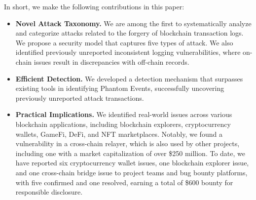In short, we make the following contributions in this paper:
\begin{itemize}
\item \textbf{Novel Attack Taxonomy.}
We are among the first to systematically analyze and categorize attacks
related to the forgery of blockchain transaction logs. We propose a security model that captures
five types of attack. We also identified previously unreported inconsistent logging
vulnerabilities, where on-chain issues result in discrepancies with off-chain records.
\item \textbf{Efficient Detection.}
We developed a detection mechanism that surpasses existing tools in identifying Phantom Events,
successfully uncovering previously unreported attack transactions.
\item \textbf{Practical Implications.}
We identified real-world issues across various blockchain applications, including blockchain
explorers, cryptocurrency wallets, GameFi, DeFi, and NFT marketplaces.
Notably, we found a vulnerability in a cross-chain relayer, which is also used by other projects,
including one with a market capitalization of over \$250 million.
To date, we have reported six cryptocurrency wallet issues, one blockchain explorer issue, and one
cross-chain bridge issue to project teams and bug bounty platforms, with five confirmed and one
resolved, earning a total of \$600 bounty for responsible disclosure.
\end{itemize}
